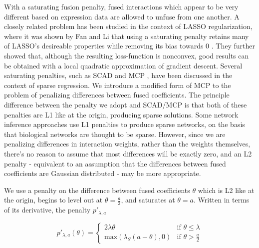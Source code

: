 \documentclass[11pt]{article}
\begin{document}
With a saturating fusion penalty, fused interactions which appear to be very different based on expression data are allowed to unfuse from one another. A closely related problem has been studied in the context of LASSO regularization, where it was shown by Fan and Li that using a saturating penalty retains many of LASSO's desireable properties while removing its bias towards 0 \cite{fan2001variable}. They further showed that, although the resulting loss-function is nonconvex, good results can be obtained with a local quadratic approximation of gradient descent. Several saturating penalties, such as SCAD \cite{fan2001variable} and MCP \cite{zhang2010nearly}, have been discussed in the context of sparse regression. We introduce a modified form of MCP to the problem of penalizing differences between fused coefficients. The principle difference between the penalty we adopt and SCAD/MCP is that both of these penalties are L1 like at the origin, producing sparse solutions. Some network inference approaches use L1 penalties to produce sparse networks, on the basis that biological networks are thought to be sparse. However, since we are penalizing differences in interaction weights, rather than the weights themselves, there's no reason to assume that most differences will be exactly zero, and an L2 penalty - equivalent to an assumption that the differences between fused coefficients are Gaussian distributed - may be more appropriate.

We use a penalty on the difference between fused coefficients $\theta$ which is L2 like at the origin, begins to level out at $\theta = \frac{a}{2}$, and saturates at $\theta = a$. Written in terms of its derivative, the penalty $p'_{\lambda, a}$

\begin{equation}
p'_{\lambda,a}(\theta) = \left\{
    \begin{array}{lr}
    2\lambda\theta & \text{if } \theta \leq \lambda\\
    \text{max}(\lambda_S(a-\theta),0) & \text{if } \theta > \frac{a}{2}
    \end{array}
    \right.
\end{equation}


\end{document}
